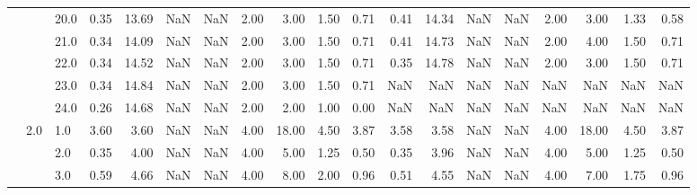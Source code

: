 \begin{tabular}{lllrrrrrrrrrrrrrrrr}
       &     & 20.0 &      0.35 &      13.69 &               NaN &                NaN & 2.00 &   3.00 &             1.50 &                         0.71 &      0.41 &      14.34 &               NaN &                NaN & 2.00 &   3.00 &             1.33 &                         0.58 \\
       &     & 21.0 &      0.34 &      14.09 &               NaN &                NaN & 2.00 &   3.00 &             1.50 &                         0.71 &      0.41 &      14.73 &               NaN &                NaN & 2.00 &   4.00 &             1.50 &                         0.71 \\
       &     & 22.0 &      0.34 &      14.52 &               NaN &                NaN & 2.00 &   3.00 &             1.50 &                         0.71 &      0.35 &      14.78 &               NaN &                NaN & 2.00 &   3.00 &             1.50 &                         0.71 \\
       &     & 23.0 &      0.34 &      14.84 &               NaN &                NaN & 2.00 &   3.00 &             1.50 &                         0.71 &       NaN &        NaN &               NaN &                NaN &  NaN &    NaN &              NaN &                          NaN \\
       &     & 24.0 &      0.26 &      14.68 &               NaN &                NaN & 2.00 &   2.00 &             1.00 &                         0.00 &       NaN &        NaN &               NaN &                NaN &  NaN &    NaN &              NaN &                          NaN \\
       & 2.0 & 1.0  &      3.60 &       3.60 &               NaN &                NaN & 4.00 &  18.00 &             4.50 &                         3.87 &      3.58 &       3.58 &               NaN &                NaN & 4.00 &  18.00 &             4.50 &                         3.87 \\
       &     & 2.0  &      0.35 &       4.00 &               NaN &                NaN & 4.00 &   5.00 &             1.25 &                         0.50 &      0.35 &       3.96 &               NaN &                NaN & 4.00 &   5.00 &             1.25 &                         0.50 \\
       &     & 3.0  &      0.59 &       4.66 &               NaN &                NaN & 4.00 &   8.00 &             2.00 &                         0.96 &      0.51 &       4.55 &               NaN &                NaN & 4.00 &   7.00 &             1.75 &                         0.96 \\

\end{tabular}
